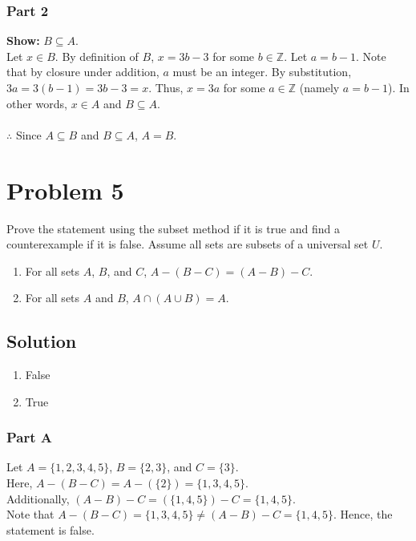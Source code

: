 \documentclass[table]{article}
\begin{document}
\subsubsection{Part 2}
\textbf{Show:} $B \subseteq A$.\\
Let $x \in B$. By definition of $B$, $x = 3b - 3$ for some $b \in \mathbb{Z}$. Let $a = b - 1$. Note that by closure under addition, $a$ must be an integer. By substitution, $3a = 3(b - 1) = 3b - 3 = x$. Thus, $x = 3a$ for some $a \in \mathbb{Z}$ (namely $a = b - 1$). In other words, $x \in A$ and $B \subseteq A$.\\~\\
$\therefore$ Since $A \subseteq B$ and $B \subseteq A$, $A = B$.
\section{Problem 5}
Prove the statement using the subset method if it is true and find a counterexample if it is
false. Assume all sets are subsets of a universal set $U$.
\begin{enumerate}[nosep, label=\alph*)]
\item For all sets $A$, $B$, and $C$, $A - (B - C) = (A - B) - C$.
\item For all sets $A$ and $B$, $A \cap (A \cup B) = A$.
\end{enumerate}
\subsection{Solution}
\begin{enumerate}[nosep, label=\alph*)]
\item False
\item True
\end{enumerate}
\subsubsection{Part A}
Let $A = \{1, 2, 3, 4, 5\}$, $B = \{2, 3\}$, and $C = \{3\}$.\\
Here, $A - (B - C) = A - (\{2\}) = \{1, 3, 4, 5\}$.\\
Additionally, $(A - B) - C = (\{1, 4, 5\}) - C = \{1, 4, 5\}$.\\
Note that $A - (B - C) = \{1, 3, 4, 5\} \neq (A - B) - C = \{1, 4, 5\}$. Hence, the statement is false.
\end{document}
